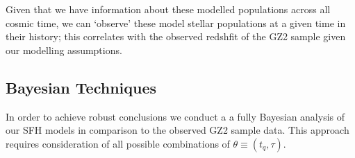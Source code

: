 \documentclass{mn2e}
\begin{document}
Given that we have information about these modelled populations across all cosmic time, we can `observe' these model stellar populations at a given time in their history; this correlates with the observed redshfit of the GZ2 sample given our modelling assumptions.

\subsection{Bayesian Techniques}
In order to achieve robust conclusions we conduct a a fully Bayesian analysis \citep{Sivia, MacKay} of our SFH models in comparison to the observed GZ2 sample data. This approach requires consideration of all possible combinations of $\theta \equiv (t_{q}, \tau)$. %
\end{document}
